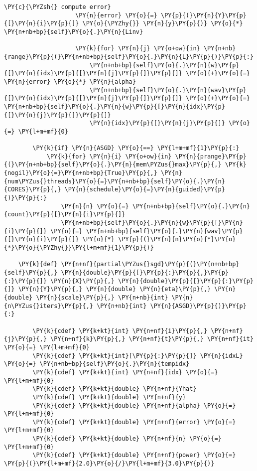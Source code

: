 \begin{Verbatim}[commandchars=\\\{\}]
                    \PY{c}{\PYZsh{} compute error}
                    \PY{n}{error} \PY{o}{=} \PY{p}{(}\PY{n}{Y}\PY{p}{[}\PY{n}{i}\PY{p}{]} \PY{o}{\PYZhy{}} \PY{n}{y}\PY{p}{)} \PY{o}{*} \PY{n+nb+bp}{self}\PY{o}{.}\PY{n}{Linv}

                    \PY{k}{for} \PY{n}{j} \PY{o+ow}{in} \PY{n+nb}{range}\PY{p}{(}\PY{n+nb+bp}{self}\PY{o}{.}\PY{n}{L}\PY{p}{)}\PY{p}{:}
                        \PY{n+nb+bp}{self}\PY{o}{.}\PY{n}{w}\PY{p}{[}\PY{n}{idx}\PY{p}{[}\PY{n}{j}\PY{p}{]}\PY{p}{]} \PY{o}{+}\PY{o}{=} \PY{n}{error} \PY{o}{*} \PY{n}{alpha}
                        \PY{n+nb+bp}{self}\PY{o}{.}\PY{n}{wav}\PY{p}{[}\PY{n}{idx}\PY{p}{[}\PY{n}{j}\PY{p}{]}\PY{p}{]} \PY{o}{+}\PY{o}{=} \PY{n+nb+bp}{self}\PY{o}{.}\PY{n}{w}\PY{p}{[}\PY{n}{idx}\PY{p}{[}\PY{n}{j}\PY{p}{]}\PY{p}{]}
                        \PY{n}{idx}\PY{p}{[}\PY{n}{j}\PY{p}{]} \PY{o}{=} \PY{l+m+mf}{0}

        \PY{k}{if} \PY{n}{ASGD} \PY{o}{==} \PY{l+m+mf}{1}\PY{p}{:}           
            \PY{k}{for} \PY{n}{i} \PY{o+ow}{in} \PY{n}{prange}\PY{p}{(}\PY{n+nb+bp}{self}\PY{o}{.}\PY{n}{mem\PYZus{}max}\PY{p}{,} \PY{k}{nogil}\PY{o}{=}\PY{n+nb+bp}{True}\PY{p}{,} \PY{n}{num\PYZus{}threads}\PY{o}{=}\PY{n+nb+bp}{self}\PY{o}{.}\PY{n}{CORES}\PY{p}{,} \PY{n}{schedule}\PY{o}{=}\PY{n}{guided}\PY{p}{)}\PY{p}{:}
                \PY{n}{n} \PY{o}{=} \PY{n+nb+bp}{self}\PY{o}{.}\PY{n}{count}\PY{p}{[}\PY{n}{i}\PY{p}{]}
                \PY{n+nb+bp}{self}\PY{o}{.}\PY{n}{w}\PY{p}{[}\PY{n}{i}\PY{p}{]} \PY{o}{=} \PY{n+nb+bp}{self}\PY{o}{.}\PY{n}{wav}\PY{p}{[}\PY{n}{i}\PY{p}{]} \PY{o}{*} \PY{p}{(}\PY{n}{n}\PY{o}{*}\PY{o}{*}\PY{o}{\PYZhy{}}\PY{l+m+mf}{1}\PY{p}{)}

    \PY{k}{def} \PY{n+nf}{partial\PYZus{}sgd}\PY{p}{(}\PY{n+nb+bp}{self}\PY{p}{,} \PY{n}{double}\PY{p}{[}\PY{p}{:}\PY{p}{,}\PY{p}{:}\PY{p}{]} \PY{n}{X}\PY{p}{,} \PY{n}{double}\PY{p}{[}\PY{p}{:}\PY{p}{]} \PY{n}{Y}\PY{p}{,} \PY{n}{double} \PY{n}{eta}\PY{p}{,} \PY{n}{double} \PY{n}{scale}\PY{p}{,} \PY{n+nb}{int} \PY{n}{n\PYZus{}iters}\PY{p}{,} \PY{n+nb}{int} \PY{n}{ASGD}\PY{p}{)}\PY{p}{:}

        \PY{k}{cdef} \PY{k+kt}{int} \PY{n+nf}{i}\PY{p}{,} \PY{n+nf}{j}\PY{p}{,} \PY{n+nf}{k}\PY{p}{,} \PY{n+nf}{t}\PY{p}{,} \PY{n+nf}{it} \PY{o}{=} \PY{l+m+mf}{0}
        \PY{k}{cdef} \PY{k+kt}{int}[\PY{p}{:}\PY{p}{]} \PY{n}{idxL} \PY{o}{=} \PY{n+nb+bp}{self}\PY{o}{.}\PY{n}{tempidx}
        \PY{k}{cdef} \PY{k+kt}{int} \PY{n+nf}{idx} \PY{o}{=} \PY{l+m+mf}{0}
        \PY{k}{cdef} \PY{k+kt}{double} \PY{n+nf}{Yhat}
        \PY{k}{cdef} \PY{k+kt}{double} \PY{n+nf}{y}
        \PY{k}{cdef} \PY{k+kt}{double} \PY{n+nf}{alpha} \PY{o}{=} \PY{l+m+mf}{0}
        \PY{k}{cdef} \PY{k+kt}{double} \PY{n+nf}{error} \PY{o}{=} \PY{l+m+mf}{0}
        \PY{k}{cdef} \PY{k+kt}{double} \PY{n+nf}{n} \PY{o}{=} \PY{l+m+mf}{0}
        \PY{k}{cdef} \PY{k+kt}{double} \PY{n+nf}{power} \PY{o}{=} \PY{p}{(}\PY{l+m+mf}{2.0}\PY{o}{/}\PY{l+m+mf}{3.0}\PY{p}{)}
    

\end{Verbatim}
